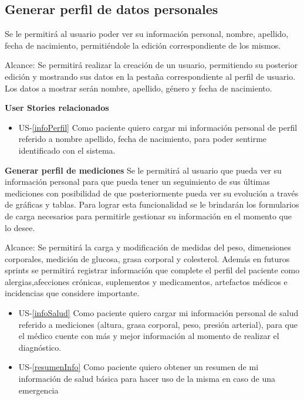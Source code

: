 \subsection{Generar perfil de datos personales}

Se le permitirá al usuario poder ver su información personal, nombre, apellido, fecha de nacimiento, permitiéndole la edición correspondiente de los mismos.

Alcance: Se permitirá realizar la creación de un usuario, permitiendo su posterior edición y mostrando sus datos en la pestaña correspondiente al perfil de usuario. Los datos a mostrar serán nombre, apellido, género y fecha de nacimiento.

		\textbf{User Stories relacionados}
        
		\begin{itemize}
			\item US-\ref{infoPerfil} Como paciente quiero cargar mi información personal de perfil referido a nombre apellido, fecha de nacimiento,  para poder sentirme identificado con el sistema.           	
		\end{itemize}


\textbf{Generar perfil de mediciones}
Se le permitirá al usuario que pueda ver su información personal para que pueda tener un seguimiento de sus últimas mediciones con posibilidad de que posteriormente pueda ver su evolución a través de gráficas y tablas.
Para lograr esta funcionalidad se le brindarán los formularios de carga necesarios para permitirle gestionar su información en el momento que lo desee.


Alcance: Se permitirá la carga y modificación de medidas del peso, dimensiones corporales, medición de glucosa, grasa corporal y colesterol.
Además en futuros sprints se permitirá registrar información que complete el perfil del paciente como alergias,afecciones crónicas, suplementos y medicamentos, artefactos médicos e incidencias que considere importante.

		\begin{itemize}
			\item  US-\ref{infoSalud} Como paciente quiero cargar mi información personal de salud referido a mediciones (altura, grasa corporal, peso, presión arterial), para que el médico cuente con más y mejor información al momento de realizar el diagnóstico.
            \item US-\ref{resumenInfo}  Como paciente quiero obtener un resumen de mi información de salud básica para hacer uso de la misma en caso de una emergencia
		\end{itemize}

